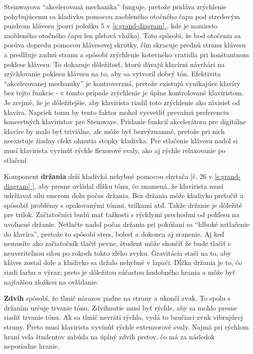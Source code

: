 \documentclass[11pt,a4paper]{book}
\newcommand*{\fullref}[1]{\hyperref[{#1}]{\ref*{#1} \nameref*{#1}}} %
\begin{document}
Steinwayova “akcelerovaná mechanika” funguje, pretože pridáva zrýchlenie pohybujúcemu sa kladivku pomocou zaobleného otočného čapu pod stredovým puzdrom klávesu [pozri položku 5 v \fullref{s:grand-diagram}, kde je namiesto zaobleného otočného čapu len plsťová vložka]. Toto spôsobí, že bod otočenia sa posúva dopredu pomocou klávesovej skrutky, čím skracuje prednú stranu klávesu a predlžuje zadnú stranu a spôsobí zrýchlenie kotevného vratidla pri konštantnom poklese klávesu. To dokazuje dôležitosť, ktorú dávajú klavírni návrhári na zrýchľovanie poklesu klávesu na to, aby sa vytvoril dobrý tón. Efektivita “akcelerovanej mechaniky” je kontroverzná, pretože existujú vynikajúce klavíry bez tejto funkcie - v tomto prípade zrýchlenie je úplne kontrolované klaviristom. Je zrejmé, že je dôležitejšie, aby klavirista riadil toto zrýchlenie ako závisieť od klavíra. Napriek tomu by tento faktor mohol vysvetliť prevažnú preferenciu koncertných klaviristov pre Steinwaye. Pridanie funkcií akcelerátora pre digitálne klavíre by malo byť triviálne, ale môže byť bezvýznamné, pretože pri nich neexistuje žiadny efekt ohnutia stopky kladivka. Pre stlačenie klávesu nadol si musí klavirista vyvinúť rýchle flexorové svaly, ako aj rýchle relaxovanie po stlačení.

Komponent \textbf{držania} drží kladivká nehybné pomocou chytača [č. 26 v \fullref{s:grand-diagram}], aby presne ovládal dĺžku tónu, čo znamená, že klavirista musí udržiavať silu smerom dolu počas držania. Bez držania môže kladivko pretočiť a spôsobiť problémy s opakovanými tónmi, trilkami atď. Takže držanie je dôležité pre trilok. Začiatočníci budú mať ťažkosti s rýchlymi prechodmi od poklesu na uvoľnené držanie. Netlačte nadol počas držania pri pokúšaní sa “hlboké zatlačenie do klavíra”, pretože to spôsobí stres, bolesť a dokonca aj zranenie. Aj keď nemusíte ako začiatočník tlačiť pevne, študent môže skončiť že bude tlačiť s neuveriteľnou silou po rokoch tohto zlého zvyku. Gravitácia stačí na to, aby kláves zostal dole a kladivko sa držalo nehybné v lapači. Dĺžka držania je to, čo riadi farbu a výraz; preto je dôležitou súčasťou hudobného hrania a môže byť najťažšou zložkou na ovládanie.

\textbf{Zdvih} spôsobí, že tlmič nárazov padne na struny a ukončí zvuk. To spolu s držaním určuje trvanie tónu. Zdvihnutie musí byť rýchle, aby sa mohlo presne riadiť trvanie tónu. Ak sa tlmič nevráti rýchlo, vydá to bzučiaci zvuk vibrujúcej struny. Preto musí klavirista vyvinúť rýchle extenzorové svaly. Najmä pri rýchlom hraní veľa študentov zabúda na úplný zdvih prstov, čo má za následok neporiadne hranie.
\end{document}
